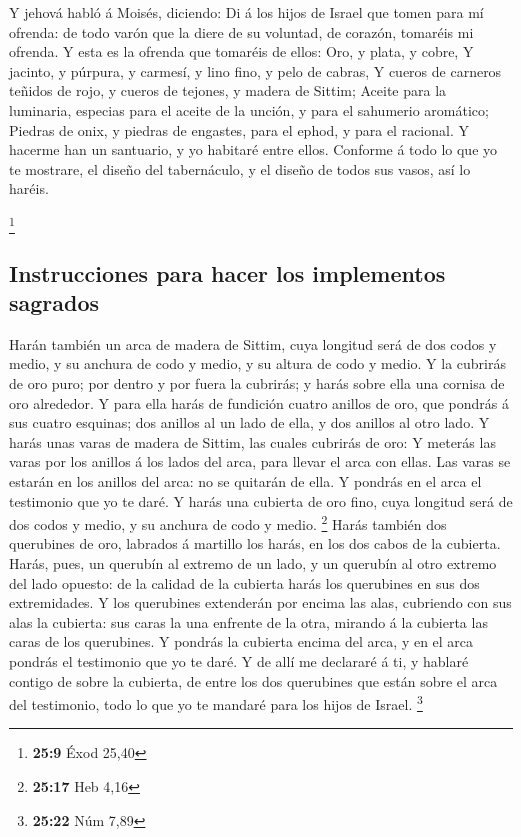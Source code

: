  Y jehová habló á Moisés, diciendo:  Di á los
hijos de Israel que tomen para mí ofrenda: de todo varón que la diere de
su voluntad, de corazón, tomaréis mi ofrenda.  Y esta es la
ofrenda que tomaréis de ellos: Oro, y plata, y cobre,  Y
jacinto, y púrpura, y carmesí, y lino fino, y pelo de cabras,
 Y cueros de carneros teñidos de rojo, y cueros de tejones,
y madera de Sittim;  Aceite para la luminaria, especias para
el aceite de la unción, y para el sahumerio aromático; 
Piedras de onix, y piedras de engastes, para el ephod, y para el
racional.  Y hacerme han un santuario, y yo habitaré entre
ellos.  Conforme á todo lo que yo te mostrare, el diseño del
tabernáculo, y el diseño de todos sus vasos, así lo haréis.

\footnote{\textbf{25:9} Éxod 25,40}

\hypertarget{instrucciones-para-hacer-los-implementos-sagrados}{%
\subsection{Instrucciones para hacer los implementos
sagrados}\label{instrucciones-para-hacer-los-implementos-sagrados}}

 Harán también un arca de madera de Sittim, cuya longitud
será de dos codos y medio, y su anchura de codo y medio, y su altura de
codo y medio.  Y la cubrirás de oro puro; por dentro y por
fuera la cubrirás; y harás sobre ella una cornisa de oro alrededor.
 Y para ella harás de fundición cuatro anillos de oro, que
pondrás á sus cuatro esquinas; dos anillos al un lado de ella, y dos
anillos al otro lado.  Y harás unas varas de madera de
Sittim, las cuales cubrirás de oro:  Y meterás las varas
por los anillos á los lados del arca, para llevar el arca con ellas.
 Las varas se estarán en los anillos del arca: no se
quitarán de ella.  Y pondrás en el arca el testimonio que
yo te daré.  Y harás una cubierta de oro fino, cuya
longitud será de dos codos y medio, y su anchura de codo y medio.
\footnote{\textbf{25:17} Heb 4,16}  Harás también dos
querubines de oro, labrados á martillo los harás, en los dos cabos de la
cubierta.  Harás, pues, un querubín al extremo de un lado,
y un querubín al otro extremo del lado opuesto: de la calidad de la
cubierta harás los querubines en sus dos extremidades.  Y
los querubines extenderán por encima las alas, cubriendo con sus alas la
cubierta: sus caras la una enfrente de la otra, mirando á la cubierta
las caras de los querubines.  Y pondrás la cubierta encima
del arca, y en el arca pondrás el testimonio que yo te daré.
 Y de allí me declararé á ti, y hablaré contigo de sobre la
cubierta, de entre los dos querubines que están sobre el arca del
testimonio, todo lo que yo te mandaré para los hijos de Israel.
\footnote{\textbf{25:22} Núm 7,89}

